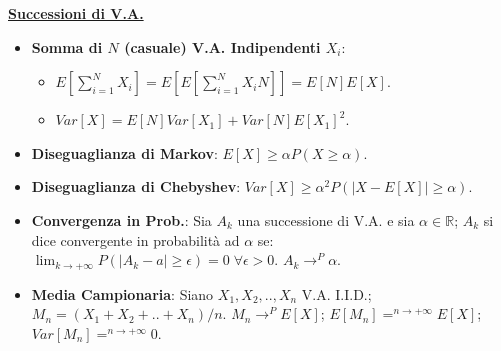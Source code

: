 \documentclass[8pt]{extarticle}
\begin{document}
\begin{multicols*}{3}
    \textbf{\underline{Successioni di V.A.}}
    \begin{itemize}
        \item \textbf{Somma di $N$ (casuale) V.A. Indipendenti $X_{i}$}:
              \begin{itemize}
                  \item $E[\sum_{i=1}^{N}X_{i}]=E[E[\sum_{i=1}^{N}X_{i}N]]=E[N]E[X]$.
                  \item $Var[X]=E[N]Var[X_{1}]+Var[N]E[X_{1}]^{2}$.
              \end{itemize}
        \item \textbf{Diseguaglianza di Markov}: $E[X]\geq \alpha P(X\geq \alpha)$.
        \item \textbf{Diseguaglianza di Chebyshev}: $Var[X]\geq \alpha^{2} P(|X-E[X]|\geq \alpha)$.
        \item \textbf{Convergenza in Prob.}: Sia ${A_{k}}$ una successione di V.A. e sia $\alpha\in\mathbb{R}$; ${A_{k}}$ si dice convergente in probabilità ad $\alpha$ se: $\lim_{k\rightarrow +\infty}P(|A_{k}-a|\geq\epsilon)=0\;\forall\epsilon >0$. $A_{k}\rightarrow^{P}\alpha$.
        \item \textbf{Media Campionaria}: Siano $X_{1},X_{2},..,X_{n}$ V.A. I.I.D.; $M_{n}=(X_{1}+X_{2}+..+X_{n})/n$. $M_{n}\rightarrow^{P} E[X]$; $E[M_{n}]=^{n\rightarrow +\infty}E[X]$; $Var[M_{n}]=^{n\rightarrow +\infty}0$.
    \end{itemize}


\end{multicols*}
\end{document}
